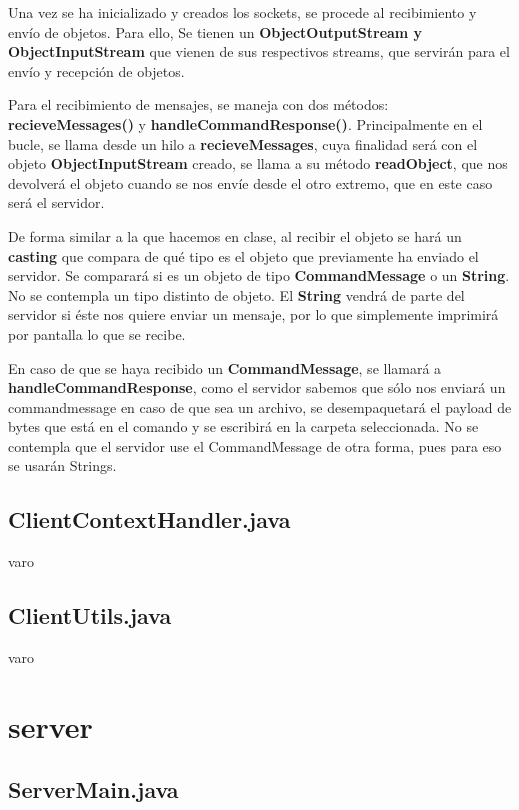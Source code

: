 \documentclass[a4paper, 12pt]{report}
\begin{document}
Una vez se ha inicializado y creados los sockets, se procede al recibimiento y envío de objetos. Para ello, Se tienen un \textbf{ObjectOutputStream y ObjectInputStream} que vienen de sus respectivos streams, que servirán para el envío y recepción de objetos.

Para el recibimiento de mensajes, se maneja con dos métodos: \textbf{recieveMessages()} y \textbf{handleCommandResponse()}. Principalmente en el bucle, se llama desde un hilo a \textbf{recieveMessages}, cuya finalidad será con el objeto \textbf{ObjectInputStream} creado, se llama a su método \textbf{readObject}, que nos devolverá el objeto cuando se nos envíe desde el otro extremo, que en este caso será el servidor.

De forma similar a la que hacemos en clase, al recibir el objeto se hará un \textbf{casting} que compara de qué tipo es el objeto que previamente ha enviado el servidor. Se comparará si es un objeto de tipo \textbf{CommandMessage} o un \textbf{String}. No se contempla un tipo distinto de objeto. El \textbf{String} vendrá de parte del servidor si éste nos quiere enviar un mensaje, por lo que simplemente imprimirá por pantalla lo que se recibe.

En caso de que se haya recibido un \textbf{CommandMessage}, se llamará a \textbf{handleCommandResponse}, como el servidor sabemos que sólo nos enviará un commandmessage en caso de que sea un archivo, se desempaquetará el payload de bytes que está en el comando y se escribirá en la carpeta seleccionada. No se contempla que el servidor use el CommandMessage de otra forma, pues para eso se usarán Strings.

\section{ClientContextHandler.java}
varo

\section{ClientUtils.java}
varo

\chapter{server}

\section{ServerMain.java}
\end{document}

